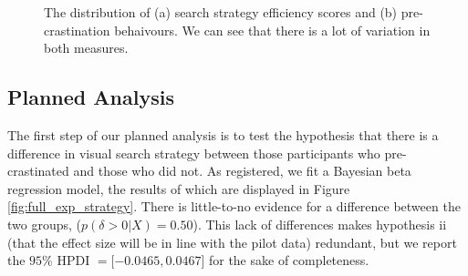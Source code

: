 \documentclass[]{rsos}
\begin{document}
\begin{figure}[t]
  \centering  
  \caption{The distribution of (a) search strategy efficiency scores and (b) pre-crastination behaivours. We can see that there is a lot of variation in both measures. }
  \label{fig:exp2_strat_summary}
\end{figure}

\subsection{Planned Analysis}

The first step of our planned analysis is to test the hypothesis that there is a difference in  visual search strategy between those participants who pre-crastinated and those who did not. As registered, we fit a Bayesian beta regression model, the results of which are displayed in Figure \ref{fig:full_exp_strategy}. There is little-to-no evidence for a difference between the two groups, ($p(\delta >0| X)  =0.50$). This lack of differences makes hypothesis ii (that the effect size will be in line with the pilot data) redundant, but we report the $95\%$ HPDI $= [-0.0465, 0.0467$] for the sake of completeness.
\end{document}
